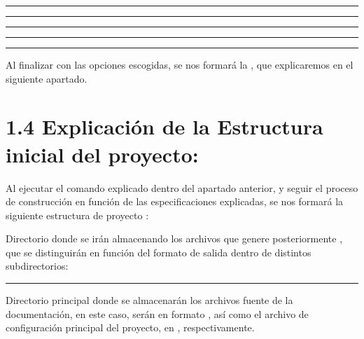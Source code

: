 \documentclass[a4paper,10pt,spanish]{sphinxmanual}
\begin{document}
\sphinxAtStartPar
{}


\bigskip\hrule\bigskip


\sphinxAtStartPar
{}


\bigskip\hrule\bigskip


\sphinxAtStartPar
{}


\bigskip\hrule\bigskip


\sphinxAtStartPar
{}


\bigskip\hrule\bigskip


\sphinxAtStartPar
{}


\bigskip\hrule\bigskip


\sphinxAtStartPar
Al finalizar con las opciones escogidas, se nos formará la , que explicaremos en el siguiente apartado.

\sphinxstepscope


\section{1.4 Explicación de la Estructura inicial del proyecto:}
\label{\detokenize{1_configuracion_inicial/estructura_inicial:explicacion-de-la-estructura-inicial-del-proyecto}}\label{\detokenize{1_configuracion_inicial/estructura_inicial::doc}}
\sphinxAtStartPar
Al ejecutar el comando explicado dentro del apartado anterior, y seguir el proceso de construcción en función de las especificaciones explicadas, se nos formará la siguiente estructura de proyecto :

\sphinxAtStartPar
{} Directorio donde se irán almacenando los archivos que genere posteriormente , que se distinguirán en función del formato de salida dentro de distintos subdirectorios: 


\bigskip\hrule\bigskip


\sphinxAtStartPar
{} Directorio principal donde se almacenarán los archivos fuente de la documentación, en este caso, serán en formato , así como el archivo de configuración principal del proyecto, en , respectivamente.
\end{document}
